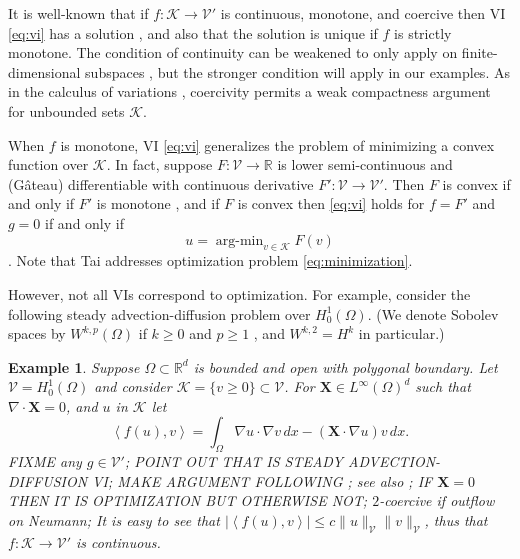 \documentclass[letterpaper,final,12pt,reqno]{amsart}
\theoremstyle{cstyle}
\theoremstyle{dstyle}
\newtheorem{example}[theorem]{Example}
\numberwithin{equation}{section}
\numberwithin{figure}{section}
\numberwithin{table}{section}
\numberwithin{theorem}{section}
\newcommand{\RR}{\mathbb{R}}
\newcommand{\grad}{\nabla}
\newcommand{\Div}{\nabla\cdot}
\newcommand{\bX}{\mathbf{X}}
\newcommand{\cK}{\mathcal{K}}
\newcommand{\cV}{\mathcal{V}}
\newcommand{\ip}[2]{\left<#1,#2\right>}
\begin{document}
It is well-known that if $f:\cK \to \cV'$ is continuous, monotone, and coercive then VI \eqref{eq:vi} has a solution \cite[Corollary III.1.8]{KinderlehrerStampacchia1980}, and also that the solution is unique if $f$ is strictly monotone.  The condition of continuity can be weakened to only apply on finite-dimensional subspaces \cite{KinderlehrerStampacchia1980}, but the stronger condition will apply in our examples.  As in the calculus of variations \cite{Evans2010}, coercivity permits a weak compactness argument for unbounded sets $\cK$.

When $f$ is monotone, VI \eqref{eq:vi} generalizes the problem of minimizing a convex function over $\cK$.  In fact, suppose $F:\cV \to \RR$ is lower semi-continuous and (G\^ateau) differentiable with continuous derivative $F':\cV \to \cV'$.  Then $F$ is convex if and only if $F'$ is monotone \cite[Proposition I.5.5]{EkelandTemam1976}, and if $F$ is convex then \eqref{eq:vi} holds for $f=F'$ and $g=0$ if and only if
\begin{equation}
u = \operatorname{arg-min}_{v\in\cK} F(v) \label{eq:minimization}
\end{equation}
\cite[Proposition II.2.1]{EkelandTemam1976}.  Note that Tai \cite{Tai2003} addresses optimization problem \eqref{eq:minimization}.

However, not all VIs correspond to optimization.  For example, consider the following steady advection-diffusion problem over $H_0^1(\Omega)$.  (We denote Sobolev spaces by $W^{k,p}(\Omega)$ if $k\ge 0$ and $p\ge 1$ \cite{Evans2010}, and $W^{k,2}=H^k$ in particular.)

\begin{example}  \label{ex:advectiondiffusion}  Suppose $\Omega \subset \RR^d$ is bounded and open with polygonal boundary.  Let $\cV = H_0^1(\Omega)$ and consider $\cK = \{v\ge 0\} \subset \cV$.  For $\bX \in L^\infty(\Omega)^d$ such that $\Div \bX=0$, and $u$ in $\cK$ let
\begin{equation}
\ip{f(u)}{v} = \int_\Omega \grad u \cdot \grad v\,dx - (\bX \cdot \grad u) v\,dx. \label{eq:nongradientexample}
\end{equation}
FIXME any $g\in\cV'$; POINT OUT THAT IS STEADY ADVECTION-DIFFUSION VI; MAKE ARGUMENT FOLLOWING \cite{Elmanetal2014}; see also \cite{Kirby2010}; IF $\bX=0$ THEN IT IS OPTIMIZATION BUT OTHERWISE NOT; $2$-coercive if outflow on Neumann; It is easy to see that $|\ip{f(u)}{v}| \le c \|u\|_{\cV} \|v\|_{\cV}$, thus that $f:\cK \to \cV'$ is continuous.
\end{example}
\end{document}
